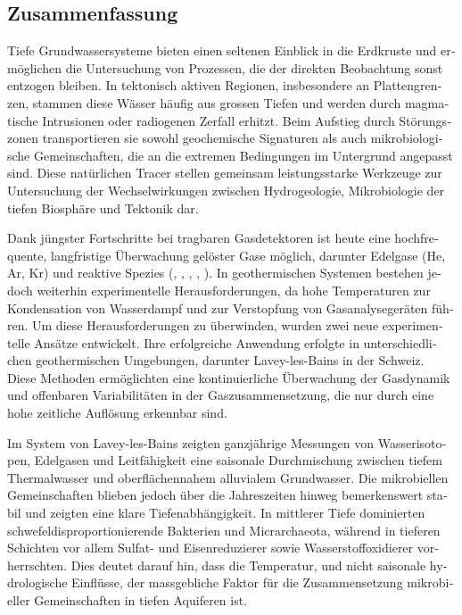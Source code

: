 \begin{otherlanguage}{ngerman}
\chapter*{Zusammenfassung}

Tiefe Grundwassersysteme bieten einen seltenen Einblick in die Erdkruste und ermöglichen die Untersuchung von Prozessen, die der direkten Beobachtung sonst entzogen bleiben.
In tektonisch aktiven Regionen, insbesondere an Plattengrenzen, stammen diese Wässer häufig aus grossen Tiefen und werden durch magmatische Intrusionen oder radiogenen Zerfall erhitzt.
Beim Aufstieg durch Störungszonen transportieren sie sowohl geochemische Signaturen als auch mikrobiologische Gemeinschaften, die an die extremen Bedingungen im Untergrund angepasst sind.
Diese natürlichen Tracer stellen gemeinsam leistungsstarke Werkzeuge zur Untersuchung der Wechselwirkungen zwischen Hydrogeologie, Mikrobiologie der tiefen Biosphäre und Tektonik dar.

Dank jüngster Fortschritte bei tragbaren Gasdetektoren ist heute eine hochfrequente, langfristige Überwachung gelöster Gase möglich, darunter Edelgase (He, Ar, Kr) und reaktive Spezies (, , , , ).
In geothermischen Systemen bestehen jedoch weiterhin experimentelle Herausforderungen, da hohe Temperaturen zur Kondensation von Wasserdampf und zur Verstopfung von Gasanalysegeräten führen.
Um diese Herausforderungen zu überwinden, wurden zwei neue experimentelle Ansätze entwickelt.
Ihre erfolgreiche Anwendung erfolgte in unterschiedlichen geothermischen Umgebungen, darunter Lavey-les-Bains in der Schweiz.
Diese Methoden ermöglichten eine kontinuierliche Überwachung der Gasdynamik und offenbaren Variabilitäten in der Gaszusammensetzung, die nur durch eine hohe zeitliche Auflösung erkennbar sind.

Im System von Lavey-les-Bains zeigten ganzjährige Messungen von Wasserisotopen, Edelgasen und Leitfähigkeit eine saisonale Durchmischung zwischen tiefem Thermalwasser und oberflächennahem alluvialem Grundwasser.
Die mikrobiellen Gemeinschaften blieben jedoch über die Jahreszeiten hinweg bemerkenswert stabil und zeigten eine klare Tiefenabhängigkeit.
In mittlerer Tiefe dominierten schwefeldisproportionierende Bakterien und Micrarchaeota, während in tieferen Schichten vor allem Sulfat- und Eisenreduzierer sowie Wasserstoffoxidierer vorherrschten.
Dies deutet darauf hin, dass die Temperatur, und nicht saisonale hydrologische Einflüsse, der massgebliche Faktor für die Zusammensetzung mikrobieller Gemeinschaften in tiefen Aquiferen ist.


\end{otherlanguage}
